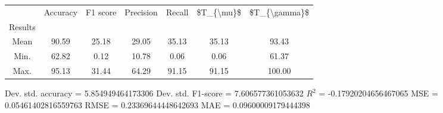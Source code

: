 \begin{tabular}{|c|c|c|c|c|c|c|}
\toprule
{} &  Accuracy &  F1 score &  Precision &  Recall &  \$T\_\{\textbackslash mu\}\$ &  \$T\_\{\textbackslash gamma\}\$ \\
Results &           &           &            &         &            &               \\
\hline
Mean    &     90.59 &     25.18 &      29.05 &   35.13 &      35.13 &         93.43 \\
Min.    &     62.82 &      0.12 &      10.78 &    0.06 &       0.06 &         61.37 \\
Max.    &     95.13 &     31.44 &      64.29 &   91.15 &      91.15 &        100.00 \\
\bottomrule
\end{tabular}

 Dev. std. accuracy = 5.854949464173306
 Dev. std. F1-score = 7.606577361053632
 $R^2$ = -0.17920204656467065
 MSE = 0.05461402816559763
 RMSE = 0.23369644448642693
 MAE = 0.09600009179444398